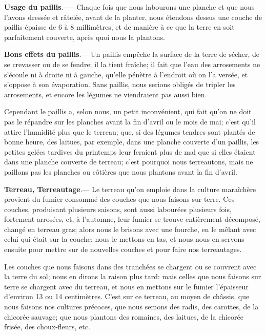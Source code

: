 \documentclass[10pt,a4paper]{book}
\begin{document}
\textbf{Usage du paillis}.—-- Chaque fois que nous labourons une planche et que nous l'avons dressée et râtelée, avant de la planter, nous étendons dessus une couche de paillis épaisse de 6 à 8 millimètres, et de manière à ce que la terre en soit parfaitement couverte, après quoi nous la plantons.

\textbf{Bons effets du paillis}.--- Un paillis empêche la surface de la terre de sécher, de se crevasser ou de se fendre; il la tient fraîche; il fait que l'eau des arrosements ne s'écoule ni à droite ni à gauche, qu'elle pénètre à l'endroit où on l'a versée, et s'oppose à son évaporation. Sans paillis, nous serions obligés de tripler les arrosements, et encore les légumes ne viendraient pas aussi bien.

Cependant le paillis a, selon nous, un petit inconvénient, qui fait qu'on ne doit pas le répandre sur les planches avant la fin d'avril ou le mois de mai; c'est qu'il attire l'humidité plus que le terreau; que, si des légumes tendres sont plantés de bonne heure, des laitues, par exemple, dans une planche couverte d'un paillis, les petites gelées tardives du printemps leur feraient plus de mal que si elles étaient dans une planche couverte de terreau; c'est pourquoi nous terreautons, mais ne paillons pas les planches ou côtières que nous plantons avant la fin d'avril.

\textbf{Terreau, Terreautage}.--- Le terreau qu'on emploie dans la culture maraîchère provient du fumier consommé des couches que nous faisons sur terre. Ces couches, produisant plusieurs saisons, sont aussi labourées plusieurs fois, fortement arrosées, et, à l'automne, leur fumier se trouve entièrement décomposé, changé en terreau gras; alors nous le brisons avec une fourche, en le mêlant avec celui qui était sur la couche; nous le mettons en tas, et nous nous en servons ensuite pour mettre sur de nouvelles couches et pour faire nos terreautages.

Les couches que nous faisons dans des tranchées se chargent ou se couvrent avec la terre du sol; nous en dirons la raison plus tard: mais celles que nous faisons sur terre se chargent avec du terreau, et nous en mettons sur le fumier l'épaisseur d'environ 13 ou 14 centimètres. C'est sur ce terreau, au moyen de châssis, que nous faisons nos cultures précoces, que nous semons des radis, des carottes, de la chicorée sauvage; que nous plantons des romaines, des laitues, de la chicorée frisée, des choux-fleurs, etc.
\end{document}
